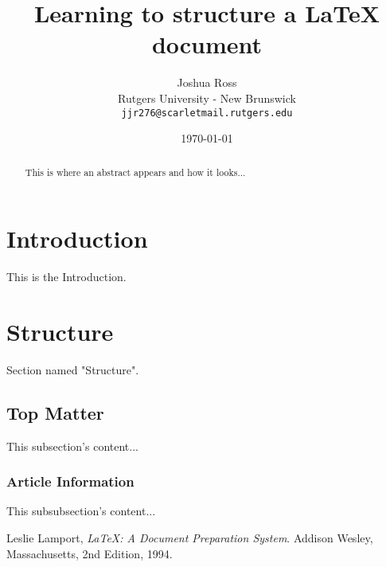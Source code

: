 \documentclass{article}
\begin{document}
\title{Learning to structure a \LaTeX{} document}

\author{Joshua Ross\\
	Rutgers University - New Brunswick\\
	\texttt{jjr276@scarletmail.rutgers.edu}}

\date{\today}

\maketitle

\begin{abstract}
This is where an abstract appears and how it looks...
\end{abstract}


\section{Introduction}
This is the Introduction.

\section{Structure}
Section named "Structure".

\subsection{Top Matter}
This subsection's content...

\subsubsection{Article Information}
This subsubsection's content... 

\begin{thebibliography}{9}
	  Leslie Lamport,
	  \emph{\LaTeX: A Document Preparation System}.
	  Addison Wesley, Massachusetts,
	  2nd Edition,
	  1994.

\end{thebibliography}
\end{document}
